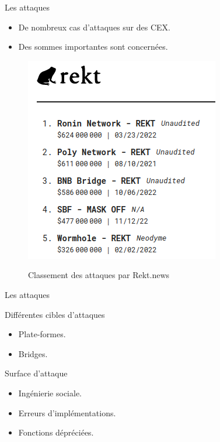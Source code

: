\begin{frame}{Les attaques}
    \begin{itemize}
        \item De nombreux cas d'attaques sur des CEX.
        \item Des sommes importantes sont concernées.
    \end{itemize}
    \begin{figure}
        \centering
        \includegraphics[scale = 0.45]{centralisation/img_attaques/rekt.png}
        \label{fig:rekt}
        \caption{Classement des attaques par Rekt.news}
    \end{figure}
\end{frame}

\begin{frame}{Les attaques}
    \begin{block}{Différentes cibles d'attaques}
        \begin{itemize}
            \item Plate-formes.
            \item Bridges.
        \end{itemize}
    \end{block}
    \pause
    \begin{block}{Surface d'attaque}
        \begin{itemize}
            \item Ingénierie sociale.
            \item Erreurs d'implémentations.
            \item Fonctions dépréciées.
        \end{itemize}
    \end{block}
\end{frame}

